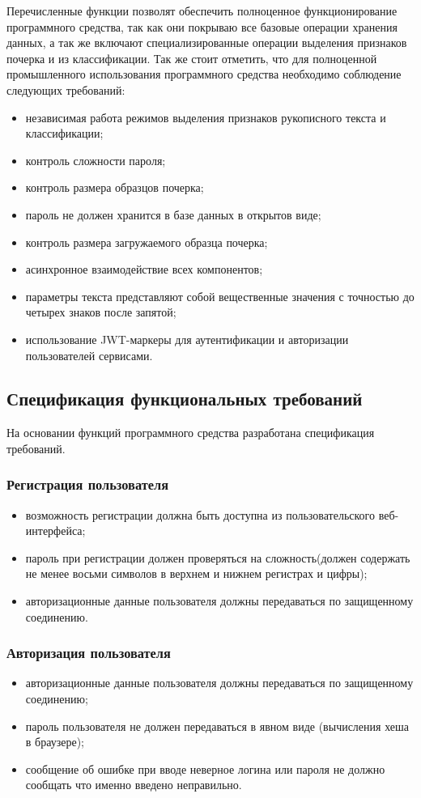Перечисленные функции позволят обеспечить полноценное функционирование программного средства, так как они покрываю все базовые операции хранения данных, а так же включают специализированные операции выделения признаков почерка и из классификации. Так же стоит отметить, что для полноценной промышленного использования программного средства необходимо соблюдение следующих требований:
\begin{itemize}
  \item независимая работа режимов выделения признаков рукописного текста и классификации;
  \item контроль сложности пароля;
  \item контроль размера образцов почерка;
  \item пароль не должен хранится в базе данных в открытов виде;
  \item контроль размера загружаемого образца почерка;
  \item асинхронное взаимодействие всех компонентов;
  \item параметры текста представляют собой вещественные значения с точностью до четырех знаков после запятой;
  \item использование JWT-маркеры для аутентификации и авторизации пользователей сервисами.
\end{itemize}

\subsection{Спецификация функциональных требований}
На основании функций программного средства разработана спецификация требований. 
\subsubsection{Регистрация пользователя}
\label{sec:freq:reg}
\begin{itemize}
	\item возможность регистрации должна быть доступна из пользовательского веб-интерфейса;
	\item пароль при регистрации должен проверяться на сложность(должен содержать не менее восьми символов в верхнем и нижнем регистрах и \mbox{цифры);}
	\item авторизационные данные пользователя должны передаваться по защищенному соединению.
\end{itemize}

\subsubsection{Авторизация пользователя}
\label{sec:freq:auth}
\begin{itemize}
	\item авторизационные данные пользователя должны передаваться по защищенному соединению;
	\item пароль пользователя не должен передаваться в явном виде (вычисления хеша в браузере);
 	\item сообщение об ошибке при вводе неверное логина или пароля не должно сообщать что именно введено неправильно.
\end{itemize}

